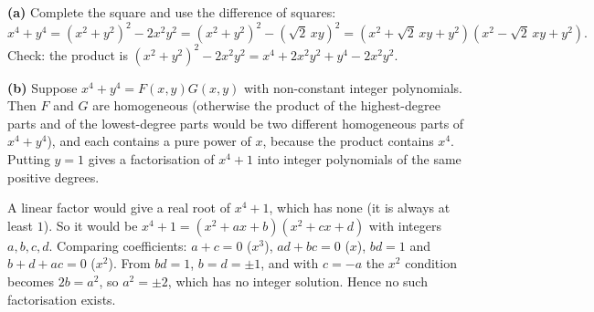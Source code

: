 \textbf{(a)} Complete the square and use the difference of squares:
\[
x^4+y^4=(x^2+y^2)^2-2x^2y^2=(x^2+y^2)^2-(\sqrt2\,xy)^2=\boxed{\left(x^2+\sqrt2\,xy+y^2\right)\left(x^2-\sqrt2\,xy+y^2\right)}.
\]
Check: the product is $(x^2+y^2)^2-2x^2y^2=x^4+2x^2y^2+y^4-2x^2y^2$.

\textbf{(b)} Suppose $x^4+y^4=F(x,y)G(x,y)$ with non-constant integer polynomials. Then $F$ and $G$ are homogeneous (otherwise the product of the highest-degree parts and of the lowest-degree parts would be two different homogeneous parts of $x^4+y^4$), and each contains a pure power of $x$, because the product contains $x^4$. Putting $y=1$ gives a factorisation of $x^4+1$ into integer polynomials of the same positive degrees.

A linear factor would give a real root of $x^4+1$, which has none (it is always at least $1$). So it would be $x^4+1=(x^2+ax+b)(x^2+cx+d)$ with integers $a,b,c,d$. Comparing coefficients: $a+c=0$ ($x^3$), $ad+bc=0$ ($x$), $bd=1$ and $b+d+ac=0$ ($x^2$). From $bd=1$, $b=d=\pm1$, and with $c=-a$ the $x^2$ condition becomes $2b=a^2$, so $a^2=\pm2$, which has no integer solution. Hence no such factorisation exists.

